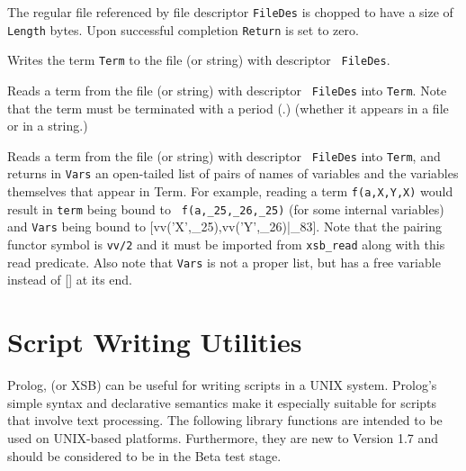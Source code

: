 \begin{description}
    The regular file  referenced by file descriptor {\tt FileDes}
    is chopped to have a size of {\tt Length} bytes. Upon successful
    completion {\tt Return} is set to zero.

    Writes the term {\tt Term} to the file (or string) with descriptor {\tt
    FileDes}.

    Reads a term from the file (or string) with descriptor {\tt
    FileDes} into {\tt Term}.  Note that the term must be terminated
    with a period (.) (whether it appears in a file or in a string.)

    Reads a term from the file (or string) with descriptor {\tt
    FileDes} into {\tt Term}, and returns in {\tt Vars} an open-tailed list of
    pairs of names of variables and the variables themselves that
    appear in Term.  For example, reading a term {\tt f(a,X,Y,X)}
    would result in {\tt term} being bound to {\tt
    f(a,\_25,\_26,\_25)} (for some internal variables) and {\tt Vars}
    being bound to {[vv('X',\_25),vv('Y',\_26)|\_83]}.  Note that the
    pairing functor symbol is {\tt vv/2} and it must be imported from
    {\tt xsb\_read} along with this read predicate.  Also note that 
    {\tt Vars} is not a proper list, but has a free variable instead 
    of [] at its end.

\end{description}

\section{Script Writing Utilities}

Prolog, (or XSB) can be useful for writing scripts in a UNIX system.
Prolog's simple syntax and declarative semantics make it especially
suitable for scripts that involve text processing.  The following
library functions are intended to be used on UNIX-based platforms.
Furthermore, they are new to Version 1.7 and should be considered to
be in the Beta test stage.

